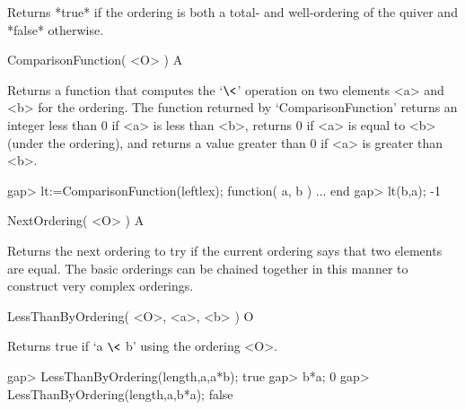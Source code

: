 Returns *true* if the ordering is both a total- and well-ordering of the
quiver and *false* otherwise.


\>ComparisonFunction( <O> ) A

Returns a function that computes the `$\<$' operation on two elements <a>
and <b> for the ordering. 
The function returned 
by `ComparisonFunction'
returns an integer less than 0
if <a> is less than <b>,
returns 0 if <a> is equal to <b> (under the ordering),
and returns a value greater than 0
if <a> is greater than <b>.

\beginexample
gap> lt:=ComparisonFunction(leftlex);
function( a, b ) ... end
gap> lt(b,a);
-1
\endexample

\>NextOrdering( <O> ) A

Returns the next ordering to try if the current ordering says that two
elements are equal.  The basic orderings can be chained together in this
manner to construct very complex orderings.

\>LessThanByOrdering( <O>, <a>, <b> ) O

Returns true if `a $\<$ b' using the ordering <O>.

\beginexample
gap> LessThanByOrdering(length,a,a*b);
true
gap> b*a;
0
gap> LessThanByOrdering(length,a,b*a);
false
\endexample
